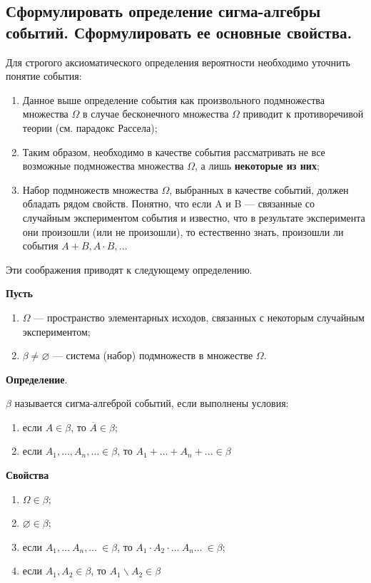 \subsection{Сформулировать определение сигма-алгебры событий. Сформулировать ее основные свойства.}

Для строгого аксиоматического определения вероятности необходимо уточнить понятие события:

\begin{enumerate}
	\item Данное выше определение события как произвольного подмножества множества $\Omega$ в случае бесконечного множества $\Omega$ приводит к противоречивой теории (см. парадокс Рассела);
	\item Таким образом, необходимо в качестве события рассматривать не все возможные подмножества множества $\Omega$, а лишь \textbf{некоторые из них}; 
	\item Набор подмножеств множества $\Omega$, выбранных в качестве событий, должен обладать рядом свойств. Понятно, что если A и B --- связанные со случайным экспериментом события и известно, что в результате эксперимента они произошли (или не произошли), то естественно знать, произошли ли события $A + B, A \cdot B, \dots$
\end{enumerate}

Эти соображения приводят к следующему определению.

\textbf{Пусть} 

\begin{enumerate}
	\item $\Omega$ --- пространство элементарных исходов, связанных с некоторым случайным экспериментом; 
	\item $\beta \neq \varnothing$ --- система (набор) подмножеств в множестве $\Omega$.
\end{enumerate}


\textbf{Определение}. 

$\beta$ называется сигма-алгеброй событий, если выполнены условия: 
\begin{enumerate}
	\item если $A \in \beta$, то $\overline{A} \in \beta$;
	\item если $A_1, \dots, A_n, \dots \in \beta$, то $A_1 + \dots + A_n + \dots \in \beta$
\end{enumerate}

\textbf{Свойства}

\begin{enumerate}
	
	\item $\Omega \in \beta$;
	\item $\varnothing \in \beta$;
	\item если $A_1, \dots\ A_n, \dots\ \in \beta$, то $A_1 \cdot A_2 \cdot \dots\ A_n \dots\ \in \beta$;
	\item если $A_1, A_2 \in \beta$, то $A_1 \backslash A_2 \in \beta$
\end{enumerate}


